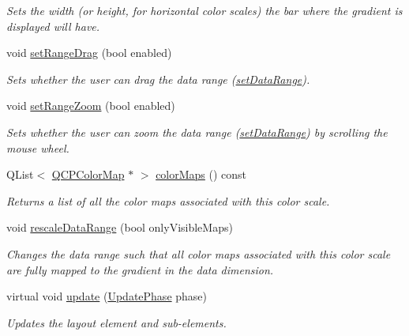 \begin{DoxyCompactItemize}
\begin{DoxyCompactList}\small\item\em Sets the width (or height, for horizontal color scales) the bar where the gradient is displayed will have. \end{DoxyCompactList}\item 
void \hyperlink{classQCPColorScale_a21c51a55e4fd581b6feadca9ee5b38d5}{set\+Range\+Drag} (bool enabled)
\begin{DoxyCompactList}\small\item\em Sets whether the user can drag the data range (\hyperlink{classQCPColorScale_abe88633003a26d1e756aa74984587fef}{set\+Data\+Range}). \end{DoxyCompactList}\item 
void \hyperlink{classQCPColorScale_a96bd60fb6317ad6821841b539c93eeeb}{set\+Range\+Zoom} (bool enabled)
\begin{DoxyCompactList}\small\item\em Sets whether the user can zoom the data range (\hyperlink{classQCPColorScale_abe88633003a26d1e756aa74984587fef}{set\+Data\+Range}) by scrolling the mouse wheel. \end{DoxyCompactList}\item 
\hypertarget{classQCPColorScale_a01bb96981614f2556ef7da04531a7a05}{}Q\+List$<$ \hyperlink{classQCPColorMap}{Q\+C\+P\+Color\+Map} $\ast$ $>$ \hyperlink{classQCPColorScale_a01bb96981614f2556ef7da04531a7a05}{color\+Maps} () const \label{classQCPColorScale_a01bb96981614f2556ef7da04531a7a05}

\begin{DoxyCompactList}\small\item\em Returns a list of all the color maps associated with this color scale. \end{DoxyCompactList}\item 
void \hyperlink{classQCPColorScale_a425983db4478543924ddbd04ea20a356}{rescale\+Data\+Range} (bool only\+Visible\+Maps)
\begin{DoxyCompactList}\small\item\em Changes the data range such that all color maps associated with this color scale are fully mapped to the gradient in the data dimension. \end{DoxyCompactList}\item 
virtual void \hyperlink{classQCPColorScale_ab8f6991ac88243fc582b44b183670334}{update} (\hyperlink{classQCPLayoutElement_a0d83360e05735735aaf6d7983c56374d}{Update\+Phase} phase)
\begin{DoxyCompactList}\small\item\em Updates the layout element and sub-\/elements. \end{DoxyCompactList}\end{DoxyCompactItemize}

